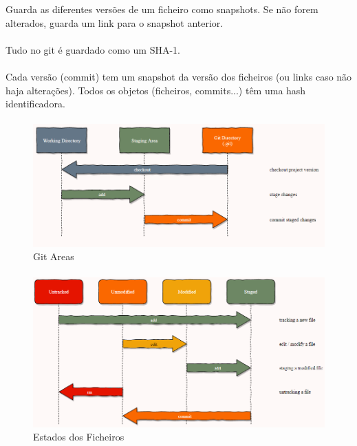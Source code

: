 \documentclass[../resumosLPOO.tex]{subfiles}
\begin{document}
 

Guarda as diferentes versões de um ficheiro como snapshots. Se não forem alterados, guarda um link para o snapshot anterior.

\paragraph{}

Tudo no git é guardado como um SHA-1.

\paragraph{}

Cada versão (commit) tem um snapshot da versão dos ficheiros (ou links caso não haja alterações). Todos os objetos (ficheiros, commits...) têm uma hash identificadora.

\paragraph{}

\begin{figure}[!h]
    \centering
    \includegraphics[width=12.5cm]{images/gitAreas.PNG}
    \caption{Git Areas}
    \label{fig:gitAreas}
\end{figure}

\paragraph{}

\begin{figure}[!h]
    \centering
    \includegraphics[width=12.5cm]{images/filesStates.PNG}
    \caption{Estados dos Ficheiros}
    \label{fig:fileStates}
\end{figure}
\end{document}
